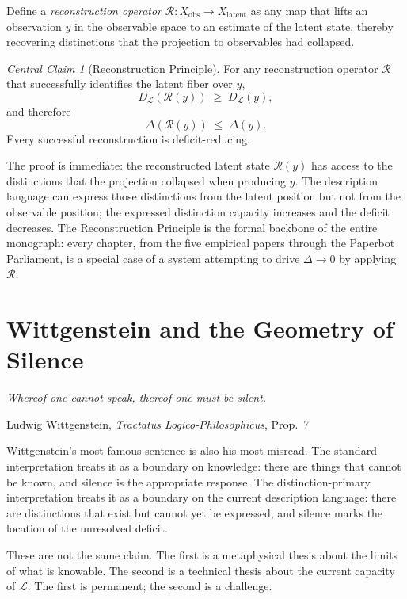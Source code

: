 \documentclass[12pt, letterpaper]{article}
\theoremstyle{remark}
\newtheorem*{claim}{Central Claim}
\begin{document}
Define a \emph{reconstruction operator}
$\mathcal{R}: X_{\mathrm{obs}} \to X_{\mathrm{latent}}$ as any map that
lifts an observation $y$ in the observable space to an estimate of the
latent state, thereby recovering distinctions that the projection to
observables had collapsed.

\begin{claim}[Reconstruction Principle]
For any reconstruction operator $\mathcal{R}$ that successfully identifies
the latent fiber over $y$,
\[
  D_{\mathcal{L}}(\mathcal{R}(y)) \;\geq\; D_{\mathcal{L}}(y),
\]
and therefore
\[
  \Delta(\mathcal{R}(y)) \;\leq\; \Delta(y).
\]
Every successful reconstruction is deficit-reducing.
\end{claim}

The proof is immediate: the reconstructed latent state $\mathcal{R}(y)$
has access to the distinctions that the projection collapsed when producing
$y$.  The description language can express those distinctions from the
latent position but not from the observable position; the expressed
distinction capacity increases and the deficit decreases.  The Reconstruction
Principle is the formal backbone of the entire monograph: every chapter,
from the five empirical papers through the Paperbot Parliament, is a
special case of a system attempting to drive $\Delta \to 0$ by applying
$\mathcal{R}$.

\section{Wittgenstein and the Geometry of Silence}

\epigraph{\itshape Whereof one cannot speak, thereof one must be
silent.}{Ludwig Wittgenstein, \textit{Tractatus Logico-Philosophicus},
Prop.\ 7}

Wittgenstein's most famous sentence is also his most misread.  The standard
interpretation treats it as a boundary on knowledge: there are things that
cannot be known, and silence is the appropriate response.  The
distinction-primary interpretation treats it as a boundary on the current
description language: there are distinctions that exist but cannot yet be
expressed, and silence marks the location of the unresolved deficit.

These are not the same claim.  The first is a metaphysical thesis about
the limits of what is knowable.  The second is a technical thesis about the
current capacity of $\mathcal{L}$.  The first is permanent; the second is
a challenge.
\end{document}
